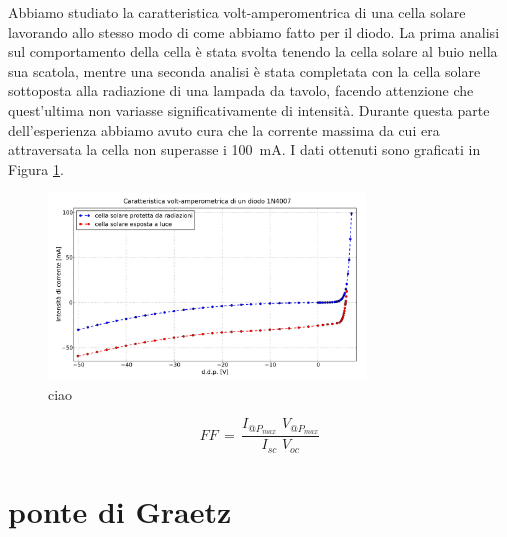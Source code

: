 Abbiamo studiato la caratteristica volt-amperomentrica di una cella solare lavorando allo stesso modo di come abbiamo fatto per il diodo.
La prima analisi sul comportamento della cella è stata svolta tenendo la cella solare al buio nella sua scatola, mentre una seconda analisi è stata completata con la cella solare sottoposta alla radiazione di una lampada da tavolo, facendo attenzione che quest'ultima non variasse significativamente di intensità.
Durante questa parte dell'esperienza abbiamo avuto cura che la corrente massima da cui era attraversata la cella non superasse i \SI{100}{\milli\ampere}. I dati ottenuti sono graficati in Figura \ref{fig:cella}.

\begin{figure}
	\includegraphics[width=0.75\textwidth]{cella.pdf}
	\caption{ciao}
	\label{fig:cella}
\end{figure}


\begin{equation}
FF \, = \, \frac{I_{@P_{max}} \,\, V_{@P_{max}}}{I_{sc} \,\, V_{oc}}
\label{eq:FF}
\end{equation}



\section{ponte di Graetz}